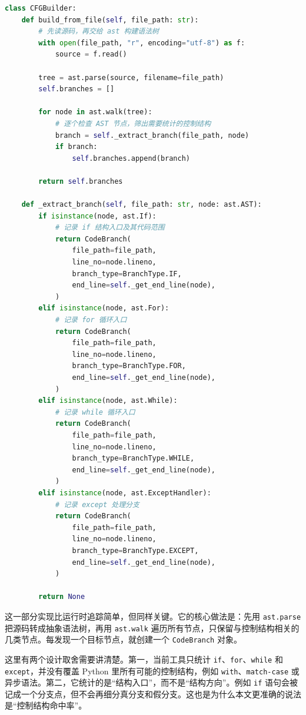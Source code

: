 \begin{lstlisting}[language=Python, caption={基于 AST 的静态分支提取}]
class CFGBuilder:
    def build_from_file(self, file_path: str):
        # 先读源码，再交给 ast 构建语法树
        with open(file_path, "r", encoding="utf-8") as f:
            source = f.read()

        tree = ast.parse(source, filename=file_path)
        self.branches = []

        for node in ast.walk(tree):
            # 逐个检查 AST 节点，筛出需要统计的控制结构
            branch = self._extract_branch(file_path, node)
            if branch:
                self.branches.append(branch)

        return self.branches

    def _extract_branch(self, file_path: str, node: ast.AST):
        if isinstance(node, ast.If):
            # 记录 if 结构入口及其代码范围
            return CodeBranch(
                file_path=file_path,
                line_no=node.lineno,
                branch_type=BranchType.IF,
                end_line=self._get_end_line(node),
            )
        elif isinstance(node, ast.For):
            # 记录 for 循环入口
            return CodeBranch(
                file_path=file_path,
                line_no=node.lineno,
                branch_type=BranchType.FOR,
                end_line=self._get_end_line(node),
            )
        elif isinstance(node, ast.While):
            # 记录 while 循环入口
            return CodeBranch(
                file_path=file_path,
                line_no=node.lineno,
                branch_type=BranchType.WHILE,
                end_line=self._get_end_line(node),
            )
        elif isinstance(node, ast.ExceptHandler):
            # 记录 except 处理分支
            return CodeBranch(
                file_path=file_path,
                line_no=node.lineno,
                branch_type=BranchType.EXCEPT,
                end_line=self._get_end_line(node),
            )

        return None
\end{lstlisting}

这一部分实现比运行时追踪简单，但同样关键。它的核心做法是：先用 \texttt{ast.parse} 把源码转成抽象语法树，再用 \texttt{ast.walk} 遍历所有节点，只保留与控制结构相关的几类节点。每发现一个目标节点，就创建一个 \texttt{CodeBranch} 对象。

这里有两个设计取舍需要讲清楚。第一，当前工具只统计 \texttt{if}、\texttt{for}、\texttt{while} 和 \texttt{except}，并没有覆盖 Python 里所有可能的控制结构，例如 \texttt{with}、\texttt{match-case} 或异步语法。第二，它统计的是“结构入口”，而不是“结构方向”。例如 \texttt{if} 语句会被记成一个分支点，但不会再细分真分支和假分支。这也是为什么本文更准确的说法是“控制结构命中率”。

